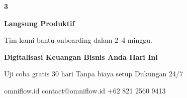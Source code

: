 \documentclass[a4paper]{article}
\begin{document}
\begin{center}
\begin{minipage}[t]{0.318\textwidth}
{\begin{minipage}{\dimexpr\linewidth-2\fboxsep\relax}
            \begin{center}
                {\fontsize{22}{26}\selectfont\bfseries\color{BluePrimary} 3}
            \end{center}
            \vspace{2pt}
            \begin{center}
                {\fontsize{10}{13}\selectfont\bfseries\color{BlueDark} Langsung Produktif}\par\vspace{3pt}
                {\fontsize{9}{12}\selectfont\color{TextDark} Tim kami bantu onboarding dalam 2--4 minggu.}
            \end{center}
            \vspace{6pt}
        \end{minipage}}
\end{minipage}
\end{center}

\vspace{8pt}

{\setlength{\fboxsep}{10pt}\setlength{\fboxrule}{0pt}%
\noindent\colorbox{BluePrimary}{%
    \begin{minipage}{\dimexpr\textwidth-2\fboxsep\relax}
        \centering
        {\fontsize{13}{16}\selectfont\bfseries\color{White}
        Digitalisasi Keuangan Bisnis Anda Hari Ini}\par\vspace{3pt}
        {\fontsize{9.5}{12}\selectfont\color{BlueMid}
        Uji coba gratis 30 hari \enspace\textbullet\enspace Tanpa biaya setup \enspace\textbullet\enspace Dukungan 24/7}\par\vspace{2pt}
        {\fontsize{9.5}{12}\selectfont\color{BlueLight}
        omniflow.id \enspace\textbullet\enspace contact@omniflow.id \enspace\textbullet\enspace +62 821 2560 9413}
    \end{minipage}}}

\restoregeometry
\pagestyle{empty}
\end{document}
